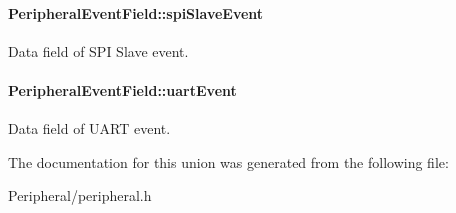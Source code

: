 \paragraph[{\texorpdfstring{spi\+Slave\+Event}{spiSlaveEvent}}]{ Peripheral\+Event\+Field\+::spi\+Slave\+Event}\hypertarget{union_peripheral_event_field_ac529d482b7d9dbf91a8d30396647c30e}{}\label{union_peripheral_event_field_ac529d482b7d9dbf91a8d30396647c30e}
Data field of S\+PI Slave event. 
\paragraph[{\texorpdfstring{uart\+Event}{uartEvent}}]{ Peripheral\+Event\+Field\+::uart\+Event}\hypertarget{union_peripheral_event_field_a0745f354d8d3a81a2d6c8cda740d105f}{}\label{union_peripheral_event_field_a0745f354d8d3a81a2d6c8cda740d105f}
Data field of U\+A\+RT event. 

The documentation for this union was generated from the following file\+:\begin{DoxyCompactItemize}
\item 
Peripheral/peripheral.\+h\end{DoxyCompactItemize}
